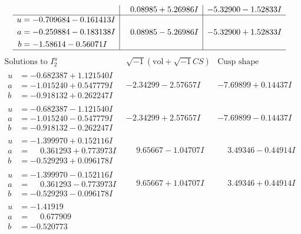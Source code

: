 \documentclass[1p]{elsarticle_modified}
\theoremstyle{definition}
\newcommand{\I}{\sqrt{-1}}
\begin{document}
$$\begin{array}{c|c|c}
 & \phantom{-}0.08985 + 5.26986 I & -5.32900 - 1.52833 I \\ \hline\begin{aligned}
u &= -0.709684 - 0.161413 I \\
a &= -0.259884 - 0.183138 I \\
b &= -1.58614 - 0.56071 I\end{aligned}
 & \phantom{-}0.08985 - 5.26986 I & -5.32900 + 1.52833 I\\
 \hline 
 \end{array}$$\newpage$$\begin{array}{c|c|c}  
\text{Solutions to }I^u_{2}& \I (\text{vol} + \sqrt{-1}CS) & \text{Cusp shape}\\
 \hline 
\begin{aligned}
u &= -0.682387 + 1.121540 I \\
a &= -1.015240 + 0.547779 I \\
b &= -0.918132 + 0.262247 I\end{aligned}
 & -2.34299 - 2.57657 I & -7.69899 + 0.14437 I \\ \hline\begin{aligned}
u &= -0.682387 - 1.121540 I \\
a &= -1.015240 - 0.547779 I \\
b &= -0.918132 - 0.262247 I\end{aligned}
 & -2.34299 + 2.57657 I & -7.69899 - 0.14437 I \\ \hline\begin{aligned}
u &= -1.399970 + 0.152116 I \\
a &= \phantom{-}0.361293 + 0.773973 I \\
b &= -0.529293 + 0.096178 I\end{aligned}
 & \phantom{-}9.65667 - 1.04707 I & \phantom{-}3.49346 - 0.44914 I \\ \hline\begin{aligned}
u &= -1.399970 - 0.152116 I \\
a &= \phantom{-}0.361293 - 0.773973 I \\
b &= -0.529293 - 0.096178 I\end{aligned}
 & \phantom{-}9.65667 + 1.04707 I & \phantom{-}3.49346 + 0.44914 I \\ \hline\begin{aligned}
u &= -1.41919\phantom{ +0.000000I} \\
a &= \phantom{-}0.677909\phantom{ +0.000000I} \\
b &= -0.520773\phantom{ +0.000000I}\end{aligned}

\end{array}$$
\end{document}
